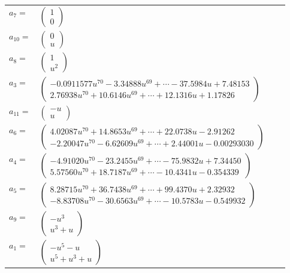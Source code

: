 \documentclass[1p]{elsarticle_modified}
\theoremstyle{definition}
\begin{document}
\begin{tabular}{m{7pt} m{180pt} m{7pt} m{180pt} }
\flushright $a_{7}=$&$\begin{pmatrix}1\\0\end{pmatrix}$ \\
\flushright $a_{10}=$&$\begin{pmatrix}0\\u\end{pmatrix}$ \\
\flushright $a_{8}=$&$\begin{pmatrix}1\\u^2\end{pmatrix}$ \\
\flushright $a_{3}=$&$\begin{pmatrix}-0.0911577 u^{70}-3.34888 u^{69}+\cdots-37.5984 u+7.48153\\2.76938 u^{70}+10.6146 u^{69}+\cdots+12.1316 u+1.17826\end{pmatrix}$ \\
\flushright $a_{11}=$&$\begin{pmatrix}- u\\u\end{pmatrix}$ \\
\flushright $a_{6}=$&$\begin{pmatrix}4.02087 u^{70}+14.8653 u^{69}+\cdots+22.0738 u-2.91262\\-2.20047 u^{70}-6.62609 u^{69}+\cdots+2.44001 u-0.00293030\end{pmatrix}$ \\
\flushright $a_{4}=$&$\begin{pmatrix}-4.91020 u^{70}-23.2455 u^{69}+\cdots-75.9832 u+7.34450\\5.57560 u^{70}+18.7187 u^{69}+\cdots-10.4341 u-0.354339\end{pmatrix}$ \\
\flushright $a_{5}=$&$\begin{pmatrix}8.28715 u^{70}+36.7438 u^{69}+\cdots+99.4370 u+2.32932\\-8.83708 u^{70}-30.6563 u^{69}+\cdots-10.5783 u-0.549932\end{pmatrix}$ \\
\flushright $a_{9}=$&$\begin{pmatrix}- u^3\\u^3+u\end{pmatrix}$ \\
\flushright $a_{1}=$&$\begin{pmatrix}- u^5- u\\u^5+u^3+u\end{pmatrix}$ \\

\end{tabular}
\end{document}
